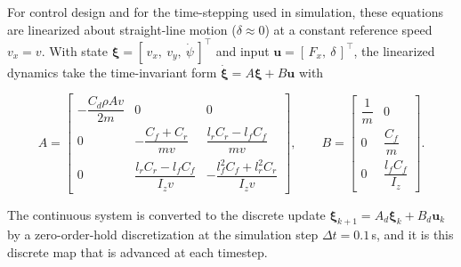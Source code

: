 For control design and for the time-stepping used in simulation, these equations are
linearized about straight-line motion ($\delta \approx 0$) at a constant reference speed
$v_x = v$. With state $\boldsymbol{\xi} = [\,v_x,\ v_y,\ \dot{\psi}\,]^\top$ and input
$\mathbf{u} = [\,F_x,\ \delta\,]^\top$, the linearized dynamics take the time-invariant form
$\dot{\boldsymbol{\xi}} = A\boldsymbol{\xi} + B\mathbf{u}$ with

\begin{equation}
    A = \begin{bmatrix}
        -\dfrac{C_d \rho A v}{2m} & 0 & 0 \\[2.2mm]
        0 & -\dfrac{C_f + C_r}{m v} & \dfrac{l_r C_r - l_f C_f}{m v} \\[2.2mm]
        0 & \dfrac{l_r C_r - l_f C_f}{I_z v} & -\dfrac{l_f^2 C_f + l_r^2 C_r}{I_z v}
    \end{bmatrix},
    \qquad
    B = \begin{bmatrix}
        \dfrac{1}{m} & 0 \\[2.2mm]
        0 & \dfrac{C_f}{m} \\[2.2mm]
        0 & \dfrac{l_f C_f}{I_z}
    \end{bmatrix}.
    \label{eq:tractor_ss}
\end{equation}

The continuous system is converted to the discrete update
$\boldsymbol{\xi}_{k+1} = A_d \boldsymbol{\xi}_k + B_d \mathbf{u}_k$ by a zero-order-hold
discretization at the simulation step $\Delta t = 0.1$\,s, and it is this discrete map that is
advanced at each timestep. 
